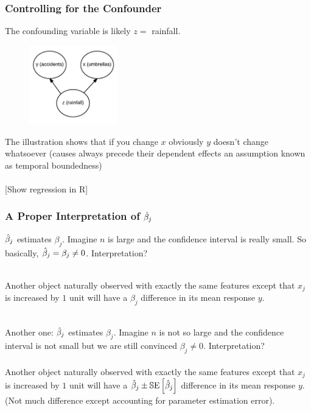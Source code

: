\documentclass[handout]{beamer}
\begin{document}
\begin{frame}\frametitle{Controlling for the Confounder}

The confounding variable is likely $z = $ rainfall.

\begin{figure}
\centering
\includegraphics[width=1.5in]{confounder}
\end{figure}

The illustration shows that if you change $x$ obviously $y$ doesn't change whatsoever (causes always precede their dependent effects an assumption known as temporal boundedness) \\~\\

[Show regression in R]

\end{frame}

\begin{frame}\frametitle{A Proper Interpretation of $\hat{\beta}_j$}

$\hat{\beta}_j$ estimates $\beta_j$. Imagine $n$ is large and the confidence interval is really small. So basically, $\hat{\beta}_j = \beta_j \neq 0$. Interpretation? \\~\\ \pause

Another object naturally observed with exactly the same features except that $x_j$ is increased by $1$ unit will have a $\beta_j$ difference in its mean response $y$.\\~\\ \pause

Another one: $\hat{\beta}_j$ estimates $\beta_j$. Imagine $n$ is not so large and the confidence interval is not small but we are still convinced $\beta_j \neq 0$.  Interpretation? \\~\\

Another object naturally observed with exactly the same features except that $x_j$ is increased by $1$ unit will have a $\hat{\beta}_j \pm \mathbb{S}\text{E}\left[\hat{\beta}_j\right]$ difference in its mean response $y$. (Not much difference except accounting for parameter estimation error).\\~\\

\end{frame}
\end{document}
